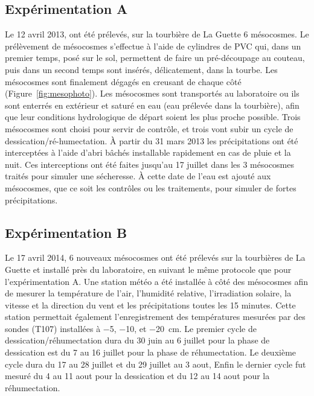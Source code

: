 \subsection{Expérimentation A}
Le 12 avril 2013, ont été prélevés, sur la tourbière de La Guette 6 mésocosmes.
Le prélèvement de mésocosmes s'effectue à l'aide de cylindres de PVC qui, dans un premier temps, posé sur le sol, permettent de faire un pré-découpage au couteau, puis dans un second temps sont insérés, délicatement, dans la tourbe. 
Les mésocosmes sont finalement dégagés en creusant de chaque côté (Figure~\ref{fig:mesophoto}).
Les mésocosmes sont transportés au laboratoire ou ils sont enterrés en extérieur et saturé en eau (eau prélevée dans la tourbière), afin que leur conditions hydrologique de départ soient les plus proche possible.
Trois mésocosmes sont choisi pour servir de contrôle, et trois vont subir un cycle de dessication/ré-humectation.
À partir du 31 mars 2013 les précipitations ont été interceptées à l'aide d'abri bâchés installable rapidement en cas de pluie et la nuit.
Ces interceptions ont été faites jusqu'au 17 juillet dans les 3 mésocosmes traités pour simuler une sécheresse.
À cette date de l'eau est ajouté aux mésocosmes, que ce soit les contrôles ou les traitements, pour simuler de fortes précipitations.

\subsection{Expérimentation B}
Le 17 avril 2014, 6 nouveaux mésocosmes ont été prélevés sur la tourbières de La Guette et installé près du laboratoire, en suivant le même protocole que pour l'expérimentation A.
Une station météo a été installée à côté des mésocosmes afin de mesurer la température de l'air, l'humidité relative, l'irradiation solaire, la vitesse et la direction du vent et les précipitations toutes les 15 minutes.
Cette station permettait également l'enregistrement des températures mesurées par des sondes (T107) installées à \num{-5}, \num{-10}, et \SI{-20}{\centi\metre}.
Le premier cycle de dessication/réhumectation dura du 30 juin au 6 juillet pour la phase de dessication est du 7 au 16 juillet pour la phase de réhumectation.
Le deuxième cycle dura du 17 au 28 juillet et du 29 juillet au 3 aout, 
Enfin le dernier cycle fut mesuré du 4 au 11 aout pour la dessication et du 12 au 14 aout pour la réhumectation.




